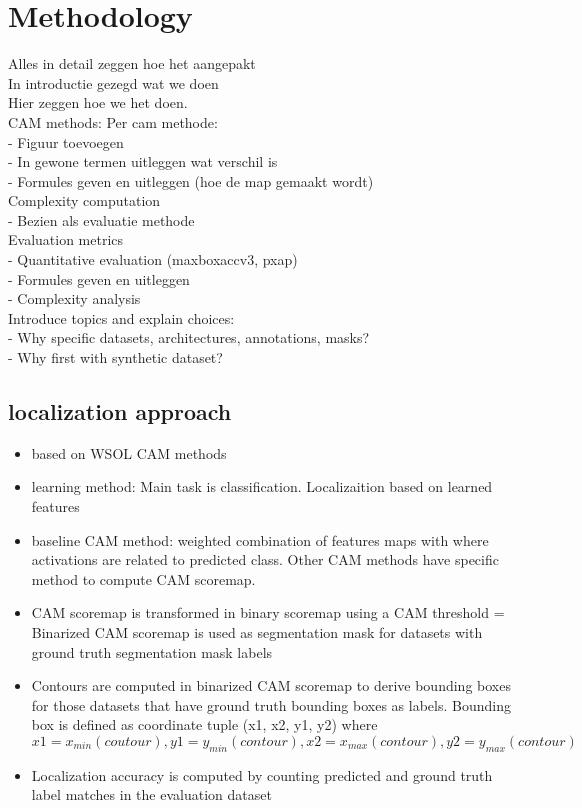 \chapter{Methodology} \label{ch:methodology}

Alles in detail zeggen hoe het aangepakt \\
In introductie gezegd wat we doen \\
Hier zeggen hoe we het doen. \\
CAM methods: Per cam methode: \\
- Figuur toevoegen \\
- In gewone termen uitleggen wat verschil is \\
- Formules geven en uitleggen (hoe de map gemaakt wordt) \\
Complexity computation \\
- Bezien als evaluatie methode \\
Evaluation metrics \\
- Quantitative evaluation (maxboxaccv3, pxap) \\
- Formules geven en uitleggen \\
- Complexity analysis \\

Introduce topics and explain choices:\\
- Why specific datasets, architectures, annotations, masks?\\
- Why first with synthetic dataset?\\


\section{localization approach}
\begin{itemize}
    \item based on WSOL CAM methods
    \item learning method: Main task is classification. Localizaition based on learned features
    \item baseline CAM method: weighted combination of features maps with where activations are related to predicted class. Other CAM methods have specific method to compute CAM scoremap.
    \item CAM scoremap is transformed in binary scoremap using a CAM threshold = Binarized CAM scoremap is used as segmentation mask for datasets with ground truth segmentation mask labels
    \item Contours are computed in binarized CAM scoremap to derive bounding boxes for those datasets that have ground truth bounding boxes as labels. Bounding box is defined as coordinate tuple (x1, x2, y1, y2) where $x1 = x_{min}(coutour), y1 = y_{min}(contour), x2 = x_{max}(contour), y2 = y_{max}(contour)$
    \item Localization accuracy is computed by counting predicted and ground truth label matches in the evaluation dataset
\end{itemize}

